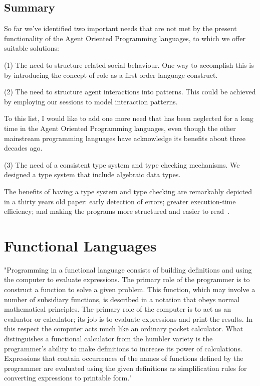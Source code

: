 \documentclass[a4paper,12pt,oneside,fleqn]{book} %
\begin{document}
\subsection{Summary} %
So far we've identified two important needs that are not met by the
present functionality of the Agent Oriented Programming languages, to which
we offer suitable solutions:

(1) The need to structure related social behaviour. One way to accomplish
this is by introducing the concept of role as a first order language
construct.

(2) The need to structure agent interactions into patterns. This could be
achieved by employing our sessions to model interaction patterns.

To this list, I would like to add one more need that has been neglected for
a long time in the Agent Oriented Programming languages, even though the
other mainstream programming languages have acknowledge its benefits about
three decades ago.

(3) The need of a consistent type system and type checking mechanisms. We
designed a type system that include algebraic data types.


The benefits of having a type system and type checking are remarkably
depicted in a thirty years old paper: early detection of
errors; greater execution-time efficiency; and making the programs more
structured and easier to read~\cite{DBLP:journals/csur/CardelliW85}.

\section{Functional Languages} %

"Programming in a functional language consists of building definitions and
using the computer to evaluate expressions. The primary role of the
programmer is to construct a function to solve a given problem. This
function, which may involve a number of subsidiary functions, is described
in a notation that obeys normal mathematical principles. The primary role
of the computer is to act as an evaluator or calculator; its job is to
evaluate expressions and print the results. In this respect the computer
acts much like an ordinary pocket calculator. What distinguishes a
functional calculator from the humbler variety is the programmer's ability
to make definitions to increase its power of calculations. Expressions that
contain occurrences of the names of functions defined by the programmer are
evaluated using the given definitions as simplification rules for converting
expressions to printable form."~\cite{}
\end{document}
